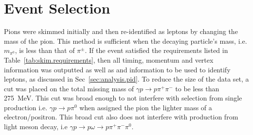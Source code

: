 \section{Event Selection}\label{sec:evnt}
	Pions were skimmed initially and then re-identified as leptons by changing the mass of the pion. This method is sufficient when the decaying particle's mass, i.e. $m_{\pi^0}$, 
	is less than that of $\pi^{\pm}$. If the event satisfied the requirements listed in Table~\ref{tab:skim.requirements}, then all timing, momentum and vertex information was 
	outputted as well as  and  information to be used to identify leptons, as discussed in Sec~\ref{sec:analysis.pid}. To reduce the size of the data set, a cut 
	was placed on the total missing mass of $\gamma p \to p \pi^{+} \pi^{-}$ to be less than 275~MeV. This cut was broad enough to not interfere with \piz selection from single 
	\piz production i.e. $\gamma p \to p \pi^{0}$ when assigned the pion the lighter mass of a electron/positron. This broad cut also does not interfere with \piz production from 
	light meson decay, i.e $\gamma p \to p \omega \to p \pi^{+} \pi^{-} \pi^{0}$. 
	